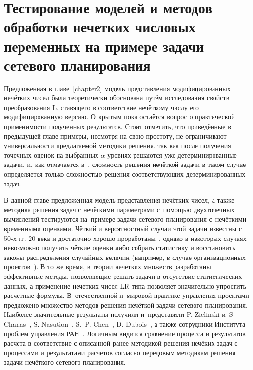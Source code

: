 \chapter{Тестирование моделей и методов обработки нечетких числовых переменных на примере задачи сетевого планирования}
\label{chapter3}

Предложенная в главе~\ref{chapter2} модель представления модифицированных нечётких чисел была теоретически обоснована путём исследования свойств преобразования L, ставящего в соответствие нечёткому числу его модифицированную версию. Открытым пока остаётся вопрос о практической применимости полученных результатов. Стоит отметить, что приведённые в предыдущей главе примеры, несмотря на свою простоту, не ограничивают универсальности предлагаемой методики решения, так как после получения точечных оценок на выбранных $\alpha$-уровнях решаются уже детерминированные задачи, и, как отмечается в~\cite{Lebedev}, сложность решения нечёткой задачи в таком случае определяется только сложностью решения соответствующих детерминированных задач.

В данной главе предложенная модель представления нечётких чисел, а также методика решения задач с нечёткими параметрами с~помощью двухточечных вычислений тестируются на~примере задачи сетевого планирования с~нечёткими временными оценками. Чёткий и вероятностный случаи этой задачи известны с 50-х гг. 20 века и достаточно хорошо проработаны~\cite{Eddous}, однако в некоторых случаях невозможно получить чёткие оценки либо собрать статистику и восстановить законы распределения случайных величин (например, в случае организационных проектов~\cite{Balashov_IPU}). В то же время, в теории нечетких множеств разработаны эффективные методы, позволяющие решать задачи в отсутствие статистических данных, а применение нечетких чисел LR-типа позволяет значительно упростить расчетные формулы. В~отечественной и~мировой практике управления проектами предложено множество методов решения нечёткой задачи сетевого планирования. Наиболее значительные результаты получили и~представили P. Zielinski и~S. Chanas~\cite{Chanas_Zielinski_Criticality, Zielinski_Preprint}, S. Nasution~\cite{Leondes}, S.~P. Chen~\cite{Chen_CPM, Chinese_CPM}, D. Dubois~\cite{Dubois_Prade}, а также сотрудники Института проблем управления РАН~\cite{Balashov_IPU}. Логичным видится сравнение процесса и результатов расчёта в соответствие с описанной ранее методикой решения нечёких задач с процессами и результатами расчётов согласно передовым методикам решения задачи нечёткого сетевого планирования.

